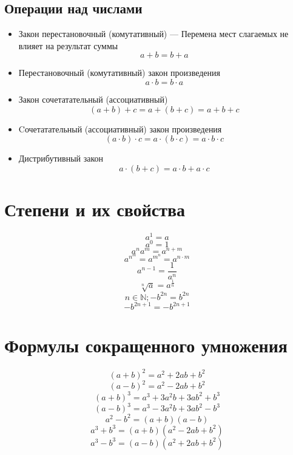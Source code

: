 \documentclass[a4paper, 12 pt]{article}
\begin{document}
\subsection{Операции над числами}
\begin{flushleft}
	\begin{itemize}
		\item Закон перестановочный (комутативный) --- Перемена мест слагаемых не влияет на результат суммы
		      \[a+b=b+a\]
		\item Перестановочный (комутативный) закон произведения
		      \[a \cdot b = b \cdot a\]
		\item Закон сочетатательный (ассоциативный)
		      \[(a+b)+c=a+(b+c)=a+b+c\]
		\item Cочетатательный (ассоциативный) закон произведения
		      \[(a \cdot b) \cdot c=a \cdot (b \cdot c)=a \cdot b \cdot c\]
		\item Дистрибутивный закон
		      \[a\cdot(b+c)=a\cdot b+a\cdot c\]

	\end{itemize}
\end{flushleft}

\section{Степени и их свойства}
\begin{flushleft}
	\[a^{1}=a\]
	\[a^{0}=1\]
	\[a^{n}a^{m}=a^{n+m}\]
	\[a^{n^{m}}=a^{m^{n}}=a^{n\cdot m}\]
	\[a^{n-1}=\frac{1}{a^{n}}\]
	\[\sqrt[n]{a}=a^{\frac{1}{n}} \]
	\[n \in \mathbb{N}; -b^{2n}=b^{2n} \]
	\[-b^{2n+1}=-b^{2n+1}\]
\end{flushleft}

\section{Формулы сокращенного умножения}
\begin{flushleft}
	\[{(a+b)}^{2}=a^{2}+2ab+b^{2}\]
	\[{(a-b)}^{2}=a^{2}-2ab+b^{2}\]
	\[{(a+b)}^{3}=a^{3}+3a^{2}b+3ab^{2}+b^{3}\]
	\[{(a-b)}^{3}=a^{3}-3a^{2}b+3ab^{2}-b^{3}\]
	\[a^2-b^2=(a+b)(a-b)\]
	\[a^3+b^3=(a+b)(a^{2}-2ab+b^{2})\]
	\[a^3-b^3=(a-b)(a^{2}+2ab+b^{2})\]
\end{flushleft}
\end{document}
